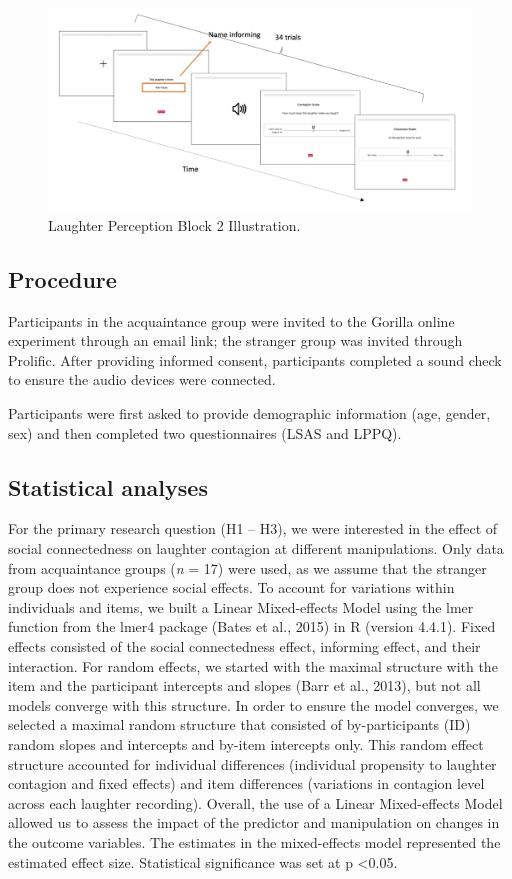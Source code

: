 \begin{figure}[h!] 
\centering
\includegraphics[width=13cm]{Screenshot 2025-09-03 at 11.29.56.png}
\caption{\label{fig2}Laughter Perception Block 2 Illustration.}
\end{figure}


\subsection{Procedure}
Participants in the acquaintance group were invited to the Gorilla online experiment through an email link; the stranger group was invited through Prolific. After providing informed consent, participants completed a sound check to ensure the audio devices were connected.

Participants were first asked to provide demographic information (age, gender, sex) and then completed two questionnaires (LSAS and LPPQ).

\subsection{Statistical analyses}
 For the primary research question (H1 – H3), we were interested in the effect of social connectedness on laughter contagion at different manipulations. Only data from acquaintance groups (\textit{n} = 17) were used, as we assume that the stranger group does not experience social effects. To account for variations within individuals and items, we built a Linear Mixed-effects Model using the lmer function from the lmer4 package (Bates et al., 2015) in R (version 4.4.1). Fixed effects consisted of the social connectedness effect, informing effect, and their interaction. For random effects, we started with the maximal structure with the item and the participant intercepts and slopes (Barr et al., 2013), but not all models converge with this structure. In order to ensure the model converges, we selected a maximal random structure that consisted of by-participants (ID) random slopes and intercepts and by-item intercepts only. This random effect structure accounted for individual differences (individual propensity to laughter contagion and fixed effects) and item differences (variations in contagion level across each laughter recording). Overall, the use of a Linear Mixed-effects Model allowed us to assess the impact of the predictor and manipulation on changes in the outcome variables. The estimates in the mixed-effects model represented the estimated effect size. Statistical significance was set at p <0.05. 
